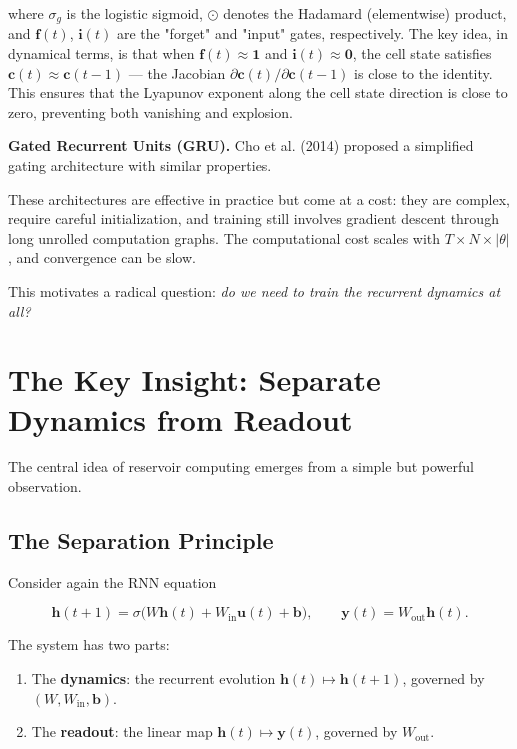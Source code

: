 where $\sigma_g$ is the logistic sigmoid, $\odot$ denotes the Hadamard (elementwise) product, and $\mathbf{f}(t)$, $\mathbf{i}(t)$ are the "forget" and "input" gates, respectively. The key idea, in dynamical terms, is that when $\mathbf{f}(t) \approx \mathbf{1}$ and $\mathbf{i}(t) \approx \mathbf{0}$, the cell state satisfies $\mathbf{c}(t) \approx \mathbf{c}(t-1)$ --- the Jacobian $\partial \mathbf{c}(t)/\partial \mathbf{c}(t-1)$ is close to the identity. This ensures that the Lyapunov exponent along the cell state direction is close to zero, preventing both vanishing and explosion.

\textbf{Gated Recurrent Units (GRU).} Cho et al. (2014) proposed a simplified gating architecture with similar properties.

These architectures are effective in practice but come at a cost: they are complex, require careful initialization, and training still involves gradient descent through long unrolled computation graphs. The computational cost scales with $T \times N \times |\theta|$, and convergence can be slow.

This motivates a radical question: \textit{do we need to train the recurrent dynamics at all?}


\bigskip


\section{The Key Insight: Separate Dynamics from Readout}\label{sec:13.4}

The central idea of reservoir computing emerges from a simple but powerful observation.

\subsection{The Separation Principle}\label{sec:13.4.1}

Consider again the RNN equation

\[
\mathbf{h}(t+1) = \sigma\!\big(W\mathbf{h}(t) + W_{\text{in}}\mathbf{u}(t) + \mathbf{b}\big), \qquad \mathbf{y}(t) = W_{\text{out}}\mathbf{h}(t).
\]

The system has two parts:

\begin{enumerate}[nosep]
  \item The \textbf{dynamics}: the recurrent evolution $\mathbf{h}(t) \mapsto \mathbf{h}(t+1)$, governed by $(W, W_{\text{in}}, \mathbf{b})$.
  \item The \textbf{readout}: the linear map $\mathbf{h}(t) \mapsto \mathbf{y}(t)$, governed by $W_{\text{out}}$.
\end{enumerate}

